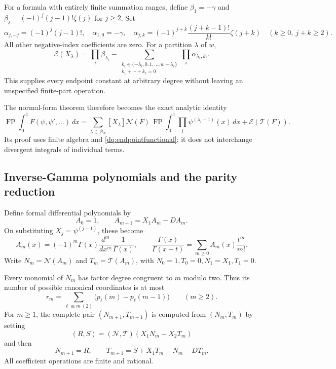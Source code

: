 For a formula with entirely finite summation ranges, define
$\beta_1=-\gamma$ and $\beta_j=(-1)^j(j-1)!\zeta(j)$ for $j\ge2$.
Set
\[
 \alpha_{j,-j}=(-1)^j(j-1)!,\quad \alpha_{1,0}=-\gamma,
 \quad
 \alpha_{j,k}=(-1)^{j+k}\frac{(j+k-1)!}{k!}\zeta(j+k)
 \quad(k\ge0,\ j+k\ge2).
\]
All other negative-index coefficients are zero. For a partition
$\lambda$ of $w$,
\begin{equation}\label{dq:finiteendpoint}
 \mathcal E(X_\lambda)=\prod_i\beta_{\lambda_i}
 -\sum_{\substack{
 k_i\in\{-\lambda_i,0,1,\ldots,w-\lambda_i\}\\
 k_1+\cdots+k_\ell=0}}
       \prod_i\alpha_{\lambda_i,k_i}.
\end{equation}
This supplies every endpoint constant at arbitrary degree without
leaving an unspecified finite-part operation.

The normal-form theorem therefore becomes the exact analytic identity
\begin{equation}\label{dq:integratednormalform}
 \operatorname{FP}\int_0^1F(\psi,\psi',\ldots)\,dx
 =\sum_{\lambda\in\mathscr B_N}
   [X_\lambda]\mathcal N(F)\,
   \operatorname{FP}\int_0^1\prod_i\psi^{(\lambda_i-1)}(x)\,dx
   +\mathcal E(\mathcal T(F)).
\end{equation}
Its proof uses finite algebra and \eqref{dq:endpointfunctional}; it
does not interchange divergent integrals of individual terms.

\subsection{Inverse-Gamma polynomials and the parity reduction}

Define formal differential polynomials by
\begin{equation}\label{dq:Arecurrence}
 A_0=1,\qquad A_{m+1}=X_1A_m-DA_m.
\end{equation}
On substituting $X_j=\psi^{(j-1)}$, these become
\[
 A_m(x)=(-1)^m\Gamma(x)\frac{d^m}{dx^m}\frac1{\Gamma(x)},
 \qquad
 \frac{\Gamma(x)}{\Gamma(x-t)}=
                 \sum_{m\ge0}A_m(x)\frac{t^m}{m!}.
\]
Write $N_m=\mathcal N(A_m)$ and $T_m=\mathcal T(A_m)$, with
$N_0=1,T_0=0,N_1=X_1,T_1=0$.

\begin{theorem}
\label{dq:parity}
Every monomial of $N_m$ has factor degree congruent to $m$ modulo two.
Thus its number of possible canonical coordinates is at most
\begin{equation}\label{dq:paritycount}
 r_m=\sum_{\ell\equiv m\ (2)}
             \bigl(p_\ell(m)-p_\ell(m-1)\bigr)\qquad(m\ge2).
\end{equation}
For $m\ge1$, the complete pair $(N_{m+1},T_{m+1})$ is computed
from $(N_m,T_m)$ by setting
\[
 (R,S)=(\mathcal N,\mathcal T)(X_1N_m-X_2T_m)
\]
and then
\begin{equation}\label{dq:pairrecurrence}
 N_{m+1}=R,\qquad
 T_{m+1}=S+X_1T_m-N_m-DT_m.
\end{equation}
All coefficient operations are finite and rational.
\end{theorem}

